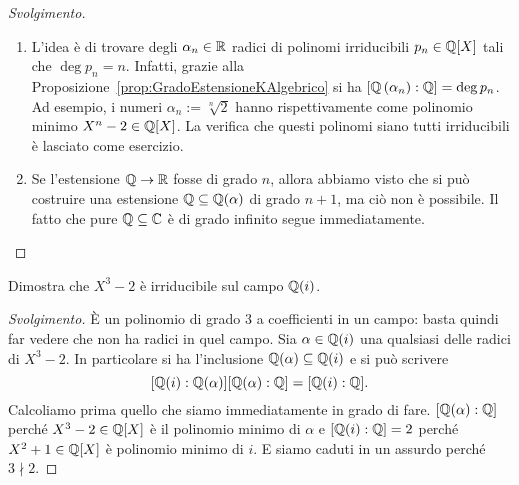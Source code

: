 \begin{proof}[Svolgimento]
\begin{enumerate}
\item L'idea è di trovare degli $\alpha_n \in \mathbb{R}$ radici di polinomi irriducibili $p_n \in \mathbb{Q}[X]$ tali che $\deg p_n = n$. Infatti, grazie alla Proposizione~\ref{prop:GradoEstensioneKAlgebrico} si ha $[\mathbb{Q}\left(\alpha_n\right) : \mathbb{Q}] = \deg p_n$. Ad esempio, i numeri $\alpha_n := \sqrt[n]{2}$ hanno rispettivamente come polinomio minimo $X^n-2 \in \mathbb{Q}[X]$. La verifica che questi polinomi siano tutti irriducibili è lasciato come esercizio.
\item Se l'estensione $\mathbb{Q} \to \mathbb{R}$ fosse di grado $n$, allora abbiamo visto che si può costruire una estensione $\mathbb{Q} \subseteq \mathbb{Q}(\alpha)$ di grado $n+1$, ma ciò non è possibile. Il fatto che pure $\mathbb{Q} \subseteq \mathbb{C}$ è di grado infinito segue immediatamente. \qedhere
\end{enumerate}
\end{proof}

\begin{eser}
Dimostra che $X^3-2$ è irriducibile sul campo $\mathbb{Q}(i)$.
\end{eser}

\begin{proof}[Svolgimento]
È un polinomio di grado $3$ a coefficienti in un campo: basta quindi far vedere che non ha radici in quel campo. Sia $\alpha \in \mathbb{Q}(i)$ una qualsiasi delle radici di $X^3-2$. In particolare si ha l'inclusione $\mathbb{Q}(\alpha) \subseteq \mathbb{Q}(i)$ e si può scrivere
\[[\mathbb{Q}(i):\mathbb{Q}(\alpha)][\mathbb{Q}(\alpha):\mathbb{Q}] = [\mathbb{Q}(i):\mathbb{Q}] .\]
Calcoliamo prima quello che siamo immediatamente in grado di fare. $[\mathbb{Q}(\alpha):\mathbb{Q}]$ perché $X^3-2 \in \mathbb{Q}[X]$ è il polinomio minimo di $\alpha$ e $[\mathbb{Q}(i):\mathbb{Q}] = 2$ perché $X^2+1 \in \mathbb{Q}[X]$ è polinomio minimo di $i$. E siamo caduti in un assurdo perché $3 \nmid 2$. 
\end{proof}


